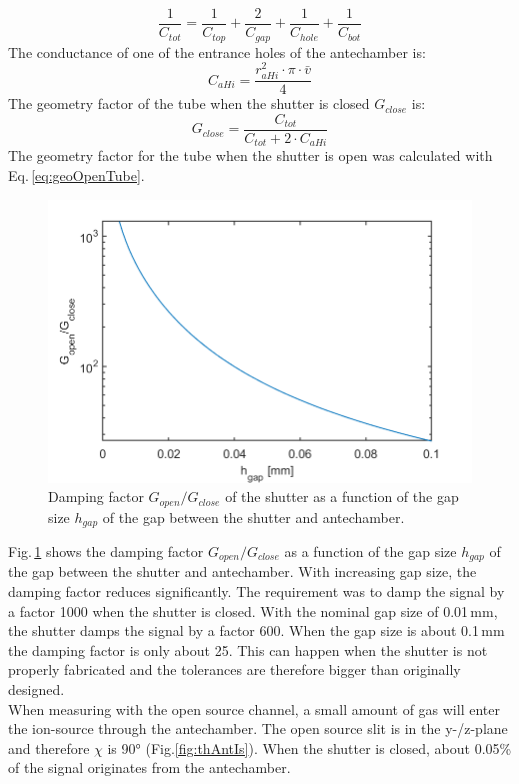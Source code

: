 	\begin{equation}
		\frac{1}{C_{tot}} = \frac{1}{C_{top}} + \frac{2}{C_{gap}} + \frac{1}{C_{hole}} + \frac{1}{C_{bot}}
	\end{equation}
	The conductance of one of the entrance holes of the antechamber is:
	\begin{equation}
		C_{aHi} = \frac{r_{aHi}^2\cdot\pi\cdot\bar{v}}{4}
	\end{equation}
	The geometry factor of the tube when the shutter is closed $G_{close}$ is:
	\begin{equation}
		G_{close} = \frac{C_{tot}}{C_{tot} + 2\cdot C_{aHi}}
	\end{equation}
	The geometry factor for the tube when the shutter is open was calculated with Eq.\,\eqref{eq:geoOpenTube}.\\
	\begin{figure}[h]
		\centering
		\includegraphics[width=.8\textwidth]{Bilder/ShutGapSizeSigDamp.png}
		\caption{Damping factor $G_{open}/G_{close}$ of the shutter as a function of the gap size $h_{gap}$ of the gap between the shutter and antechamber.}
		\label{fig:ShutGapSizeSigDamp}
	\end{figure}
	Fig.\,\ref{fig:ShutGapSizeSigDamp} shows the damping factor $G_{open}/G_{close}$ as a function of the gap size $h_{gap}$ of the gap between the shutter and antechamber. With increasing gap size, the damping factor reduces significantly. The requirement was to damp the signal by a factor 1000 when the shutter is closed. With the nominal gap size of 0.01\,mm, the shutter damps the signal by a factor 600. When the gap size is about 0.1\,mm the damping factor is only about 25. This can happen when the shutter is not properly fabricated and the tolerances are therefore bigger than originally designed.\\
	When measuring with the open source channel, a small amount of gas will enter the ion-source through the antechamber. The open source slit is in the y-/z-plane and therefore $\chi$ is 90\si{\degree} (Fig.\ref{fig:thAntIs}). When the shutter is closed, about 0.05\% of the signal originates from the antechamber.
	
